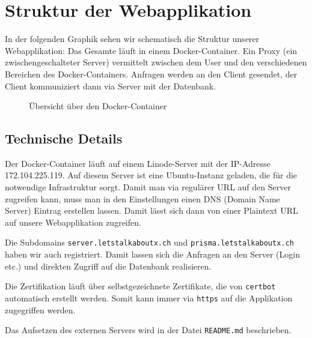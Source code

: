\section{Struktur der Webapplikation}

In der folgenden Graphik sehen wir schematisch die Struktur unserer Webapplikation: Das Gesamte läuft in einem Docker-Container. Ein Proxy (ein zwischengeschalteter Server) vermittelt zwischen dem User und den verschiedenen Bereichen des Docker-Containers. Anfragen werden an den Client gesendet, der Client kommuniziert dann via Server mit der Datenbank.
\begin{figure}[ht]
    \caption{Übersicht über den Docker-Container \cite{fig:docker}}
\end{figure}

\subsection{Technische Details}

Der Docker-Container läuft auf einem Linode-Server mit der IP-Adresse 172.104.225.119. Auf diesem Server ist eine Ubuntu-Instanz geladen, die für die notwendige Infrastruktur sorgt. Damit man via regulärer URL auf den Server zugreifen kann, muss man in den Einstellungen einen DNS (Domain Name Server) Eintrag erstellen lassen. Damit lässt sich dann von einer Plaintext URL auf unsere Webapplikation zugreifen. 

Die Subdomains \verb|server.letstalkaboutx.ch| und \verb|prisma.letstalkaboutx.ch| haben wir auch registriert. Damit lassen sich die Anfragen an den Server (Login etc.) und direkten Zugriff auf die Datenbank realisieren.

Die Zertifikation läuft über selbstgezeichnete Zertifikate, die von \verb|certbot| automatisch erstellt werden. Somit kann immer via \verb|https| auf die Applikation zugegriffen werden.

Das Aufsetzen des externen Servers wird in der Datei \verb|README.md| beschrieben.









